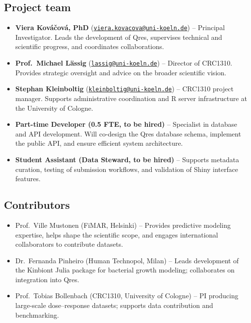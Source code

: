\documentclass[
  letterpaper,
  DIV=11,
  numbers=noendperiod]{scrartcl}
\providecommand{\tightlist}{%
  \setlength{\itemsep}{0pt}\setlength{\parskip}{0pt}}
\begin{document}
\subsection{Project team}\label{project-team}

\begin{itemize}
\tightlist
\item
  \textbf{Viera Kováčová, PhD}
  (\href{mailto:viera.kovacova@uni-koeln.de}{\nolinkurl{viera.kovacova@uni-koeln.de}})
  -- Principal Investigator. Leads the development of Qres, supervises
  technical and scientific progress, and coordinates collaborations.\\
\item
  \textbf{Prof.~Michael Lässig}
  (\href{mailto:lassig@uni-koeln.de}{\nolinkurl{lassig@uni-koeln.de}})
  -- Director of CRC1310. Provides strategic oversight and advice on the
  broader scientific vision.\\
\item
  \textbf{Stephan Kleinboltig}
  (\href{mailto:kleinboltig@uni-koeln.de}{\nolinkurl{kleinboltig@uni-koeln.de}})
  -- CRC1310 project manager. Supports administrative coordination and R
  server infrastructure at the University of Cologne.\\
\item
  \textbf{Part-time Developer (0.5 FTE, to be hired)} -- Specialist in
  database and API development. Will co-design the Qres database schema,
  implement the public API, and ensure efficient system architecture.\\
\item
  \textbf{Student Assistant (Data Steward, to be hired)} -- Supports
  metadata curation, testing of submission workflows, and validation of
  Shiny interface features.
\end{itemize}

\subsection{Contributors}\label{contributors}

\begin{itemize}
\tightlist
\item
  Prof.~Ville Mustonen (FiMAR, Helsinki) -- Provides predictive modeling
  expertise, helps shape the scientific scope, and engages international
  collaborators to contribute datasets.
\item
  Dr.~Fernanda Pinheiro (Human Technopol, Milan) -- Leads development of
  the Kinbiont Julia package for bacterial growth modeling; collaborates
  on integration into Qres.
\item
  Prof.~Tobias Bollenbach (CRC1310, University of Cologne) -- PI
  producing large-scale dose--response datasets; supports data
  contribution and benchmarking.
\end{itemize}
\end{document}
